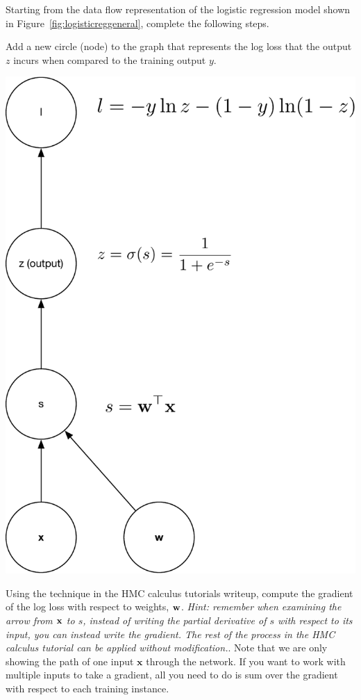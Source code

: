 \documentclass[assignment06_Solutions]{subfiles}
\begin{document}
\begin{exercise}[(30 minutes)]
Starting from the data flow representation of the logistic regression model shown in Figure~\ref{fig:logisticreggeneral}, complete the following steps.
\bes
\item Add a new circle (node) to the graph that represents the log loss that the output $z$ incurs when compared to the training output $y$.
\begin{boxedsolution}
\begin{center}
\includegraphics[width=0.6\linewidth]{figures/4asolution}
\end{center}
\end{boxedsolution}
\item Using the technique in the HMC calculus tutorials writeup, compute the gradient of the log loss with respect to weights, $\mathbf{w}$.  \emph{Hint: remember when examining the arrow from $\mathbf{x}$ to $s$, instead of writing the partial derivative of $s$ with respect to its input, you can instead write the gradient.  The rest of the process in the HMC calculus tutorial can be applied without modification.}.   Note that we are only showing the path of one input $\mathbf{x}$ through the network.  If you want to work with multiple inputs to take a gradient, all you need to do is sum over the gradient with respect to each training instance.
\begin{boxedsolution}
\begin{center}

\end{center}
\end{boxedsolution}
\end{exercise}
\end{document}
